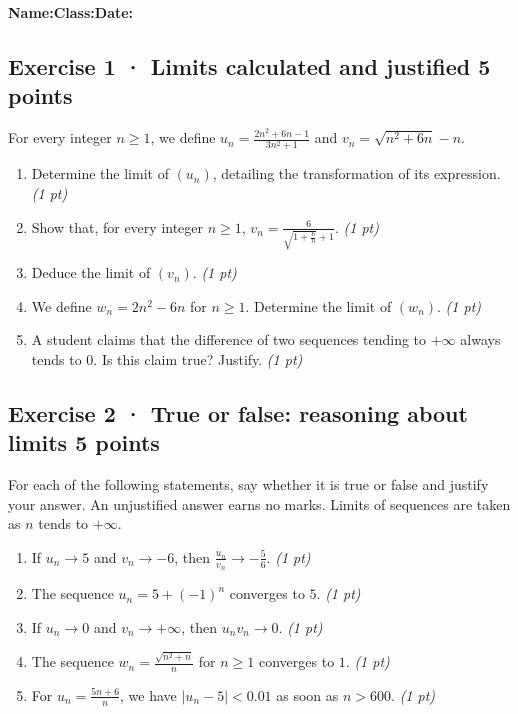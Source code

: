 \smallskip\textbf{Name:}\enspace\dotfill\quad\textbf{Class:}\enspace\dotfill\quad\textbf{Date:}\enspace\dotfill

\subsection*{Exercise 1 · Limits calculated and justified \hfill 5 points}For every integer $n\ge1$, we define $u_n=\frac{2n^2+6n-1}{3n^2+1}$ and $v_n=\sqrt{n^2+6n}-n$.

\begin{enumerate}

\item Determine the limit of $(u_n)$, detailing the transformation of its expression. \hfill\textit{(1 pt)}

\item Show that, for every integer $n\ge1$, $v_n=\frac{6}{\sqrt{1+\frac{6}n}+1}$. \hfill\textit{(1 pt)}

\item Deduce the limit of $(v_n)$. \hfill\textit{(1 pt)}

\item We define $w_n=2n^2-6n$ for $n\ge1$. Determine the limit of $(w_n)$. \hfill\textit{(1 pt)}

\item A student claims that the difference of two sequences tending to $+\infty$ always tends to $0$. Is this claim true? Justify. \hfill\textit{(1 pt)}

\end{enumerate}

\subsection*{Exercise 2 · True or false: reasoning about limits \hfill 5 points}For each of the following statements, say whether it is true or false and justify your answer. An unjustified answer earns no marks. Limits of sequences are taken as $n$ tends to $+\infty$.

\begin{enumerate}

\item If $u_n\to 5$ and $v_n\to-6$, then $\frac{u_n}{v_n}\to-\frac{5}{6}$. \hfill\textit{(1 pt)}

\item The sequence $u_n=5+(-1)^n$ converges to $5$. \hfill\textit{(1 pt)}

\item If $u_n\to0$ and $v_n\to+\infty$, then $u_nv_n\to0$. \hfill\textit{(1 pt)}

\item The sequence $w_n=\frac{\sqrt{n^2+n}}{n}$ for $n\ge1$ converges to $1$. \hfill\textit{(1 pt)}

\item For $u_n=\frac{5n+6}{n}$, we have $|u_n-5|<\num{0,01}$ as soon as $n> 600$. \hfill\textit{(1 pt)}

\end{enumerate}

